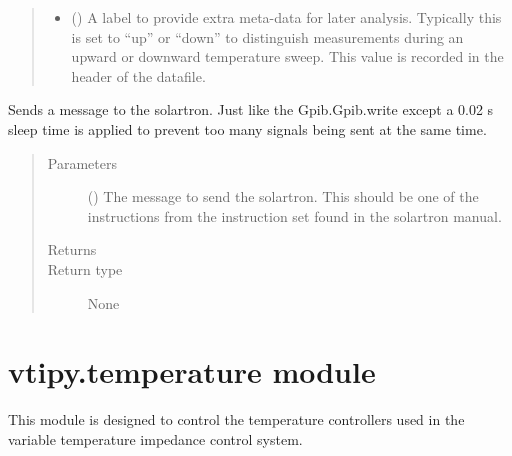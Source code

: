 \documentclass[letterpaper,10pt,english]{sphinxmanual}
\begin{document}
\begin{fulllineitems}
\begin{fulllineitems}
\begin{quote}
\begin{description}
\begin{itemize}
\item {} 
 () \textendash{} A label to provide extra meta-data for later analysis.
Typically this is set to “up” or “down” to distinguish measurements
during an upward or downward temperature sweep. This value is
recorded in the header of the datafile.

\end{itemize}

\end{description}\end{quote}

\end{fulllineitems}


\begin{fulllineitems}
\label{\detokenize{vtipy_docs/vtipy:vtipy.impedance.solartron1260.send}}
Sends a message to the solartron. Just like the Gpib.Gpib.write except
a 0.02 s sleep time is applied to prevent too many signals being sent
at the same time.
\begin{quote}\begin{description}
\item[{Parameters}] \leavevmode
{} () \textendash{} The message to send the solartron. This should be one
of the instructions from the instruction set found in the
solartron manual.

\item[{Returns}] \leavevmode


\item[{Return type}] \leavevmode
None

\end{description}\end{quote}

\end{fulllineitems}


\end{fulllineitems}



\section{vtipy.temperature module}
\label{\detokenize{vtipy_docs/vtipy:vtipy-temperature-module}}\label{\detokenize{vtipy_docs/vtipy:module-vtipy.temperature}}
This module is designed to control the temperature controllers used in the
variable temperature impedance control system.
\end{document}
